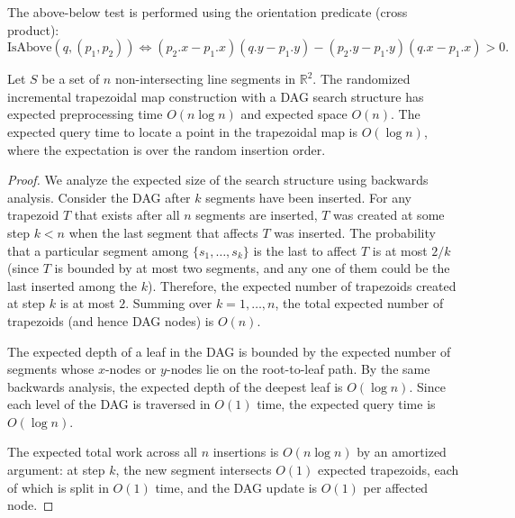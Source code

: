 The above-below test is performed using the orientation predicate (cross product):
\[
\text{IsAbove}(q, (p_1, p_2)) \iff (p_2.x - p_1.x)(q.y - p_1.y) - (p_2.y - p_1.y)(q.x - p_1.x) > 0.
\]

\begin{theorem}\label{thm:trapezoidal_complexity}
Let $S$ be a set of $n$ non-intersecting line segments in $\mathbb{R}^2$. The randomized incremental trapezoidal map construction with a DAG search structure has expected preprocessing time $O(n \log n)$ and expected space $O(n)$. The expected query time to locate a point in the trapezoidal map is $O(\log n)$, where the expectation is over the random insertion order.
\end{theorem}
\begin{proof}
We analyze the expected size of the search structure using backwards analysis. Consider the DAG after $k$ segments have been inserted. For any trapezoid $T$ that exists after all $n$ segments are inserted, $T$ was created at some step $k < n$ when the last segment that affects $T$ was inserted. The probability that a particular segment among $\{s_1, \ldots, s_k\}$ is the last to affect $T$ is at most $2/k$ (since $T$ is bounded by at most two segments, and any one of them could be the last inserted among the $k$). Therefore, the expected number of trapezoids created at step $k$ is at most $2$. Summing over $k = 1, \ldots, n$, the total expected number of trapezoids (and hence DAG nodes) is $O(n)$.

The expected depth of a leaf in the DAG is bounded by the expected number of segments whose $x$-nodes or $y$-nodes lie on the root-to-leaf path. By the same backwards analysis, the expected depth of the deepest leaf is $O(\log n)$. Since each level of the DAG is traversed in $O(1)$ time, the expected query time is $O(\log n)$.

The expected total work across all $n$ insertions is $O(n \log n)$ by an amortized argument: at step $k$, the new segment intersects $O(1)$ expected trapezoids, each of which is split in $O(1)$ time, and the DAG update is $O(1)$ per affected node.
\end{proof}

